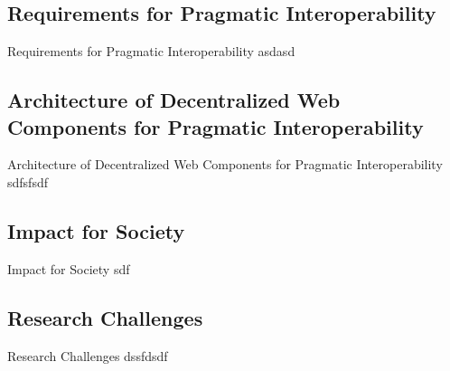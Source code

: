 \documentclass[10pt]{beamer}
\begin{document}
  \subsection{Requirements for Pragmatic Interoperability}

    \begin{frame}[fragile]{Requirements for Pragmatic Interoperability}
      asdasd
    \end{frame}

  \subsection{Architecture of Decentralized Web Components for Pragmatic Interoperability}

    \begin{frame}[fragile]{Architecture of Decentralized Web Components for Pragmatic Interoperability}
      sdfsfsdf
    \end{frame}

  \subsection{Impact for Society}

    \begin{frame}[fragile]{Impact for Society}
      sdf
    \end{frame}

  \subsection{Research Challenges}

    \begin{frame}[fragile]{Research Challenges}
      dssfdsdf
    \end{frame}
\end{document}
